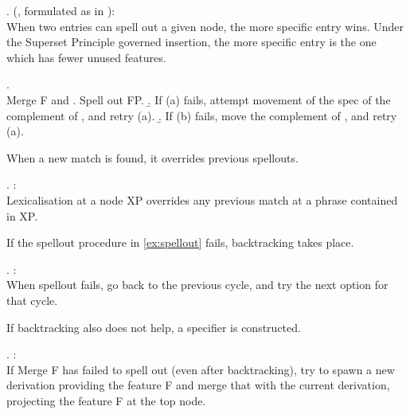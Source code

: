 \ex.  (\citealt{kiparsky1973}, formulated as in \citealt{caha2020}):\\
When two entries can spell out a given node, the more specific entry wins. Under the Superset Principle governed insertion, the more specific entry is the one which has fewer unused features.

\ex. \\
Merge F and \label{ex:spellout}
 \a. Spell out FP.
 \b. If (a) fails, attempt movement of the spec of the complement of , and retry (a).
 \b. If (b) fails, move the complement of , and retry (a).

When a new match is found, it overrides previous spellouts.

\ex.  \citep{starke2018}:\\
Lexicalisation at a node XP overrides any previous match at a phrase contained in XP.

If the spellout procedure in \ref{ex:spellout} fails, backtracking takes place.

\ex.  \citep{starke2018}:\\
When spellout fails, go back to the previous cycle, and try the next option for that cycle.\label{ex:backtracking}

If backtracking also does not help, a specifier is constructed.

\ex.  \citep{starke2018}:\\
If Merge F has failed to spell out (even after backtracking), try to spawn a new derivation providing the feature F and merge that with the current derivation, projecting the feature F at the top node.\label{ex:specformation}





\phantom{hi}
